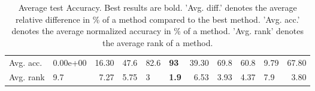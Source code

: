 \begin{table}[ht!]
\begin{tabular}{llrlllrlllr}
  Avg. acc. & 0.00e+00 & 16.30 & 47.6 & 82.6 & \textbf{93} & 39.30 & 69.8 & 60.8 & 9.79 & 67.80 \\ 
  Avg. rank & 9.7 & 7.27 & 5.75 & 3 & \textbf{1.9} & 6.53 & 3.93 & 4.37 & 7.9 & 3.80 \\ 
   \hline
\hline
\end{tabular}
\endgroup
\caption{Average test Accuracy. 
                  Best results are bold. 
                  'Avg. diff.' denotes the average relative difference in \% of a method compared to the best method.
                  'Avg. acc.' denotes the average normalized accuracy in \% of a method.
                  'Avg. rank' denotes the average rank of a method.} 
\label{TABLES/table_results_Accuracy_spatial_depth}
\end{table}
